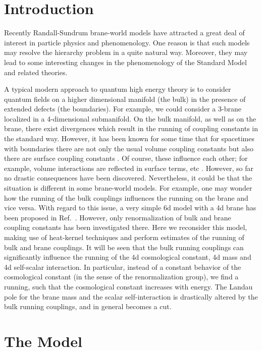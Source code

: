 \documentclass[a4paper,aps,prl,preprint,groupedaddress,showpacs,nobibnotes,tightenlines]{revtex4}
\begin{document}
\section{Introduction}
Recently Randall-Sundrum brane-world models \cite{RS} have attracted a great 
deal of interest in particle physics and phenomenology. One reason is 
that such models may resolve the hierarchy problem in a quite natural way.
Moreover, they may lead to some interesting changes in the
phenomenology of the Standard Model and related theories. 

A typical modern approach to quantum high energy theory is to consider
quantum fields on a
higher dimensional manifold (the bulk) in the presence 
of extended defects (the boundaries). For example, we could consider a 
3-brane localized in a 4-dimensional submanifold. On the bulk manifold, 
as  well as on the brane, there
exist divergences which result in the running of coupling constants 
in the standard way.
However, it has been known for some time that for spacetimes with boundaries 
there are not only the usual volume coupling constants but also
there are surface coupling constants \cite{surface}.
Of course, these influence each other; for example,  volume interactions
are reflected in surface terms, etc \cite{tsoupros}.
However, so far no drastic consequences have been discovered.
Nevertheless, it could be that the situation is different in some brane-world 
models. For example, one may 
wonder how the running of the bulk couplings influences the running on the 
brane and vice versa. With regard to this issue, a very simple 6d model
with a 4d brane has been proposed in Ref.~\cite{wise}. However, only
renormalization of bulk and brane coupling constants has been 
investigated there.
Here we reconsider this model, making use of  heat-kernel techniques
and perform estimates of the running of bulk and brane couplings.
It will be seen that the bulk running couplings can significantly influence 
the running of the 4d cosmological constant, 4d mass and 4d self-scalar 
interaction. In particular, instead of a constant behavior of 
the cosmological 
constant (in the sense of the renormalization group), we find a running,
such that the cosmological constant increases with energy.
The Landau pole for the brane mass and the scalar self-interaction
is drastically altered by the bulk running couplings, and in general
becomes a cut.

\section{The Model}
\end{document}
